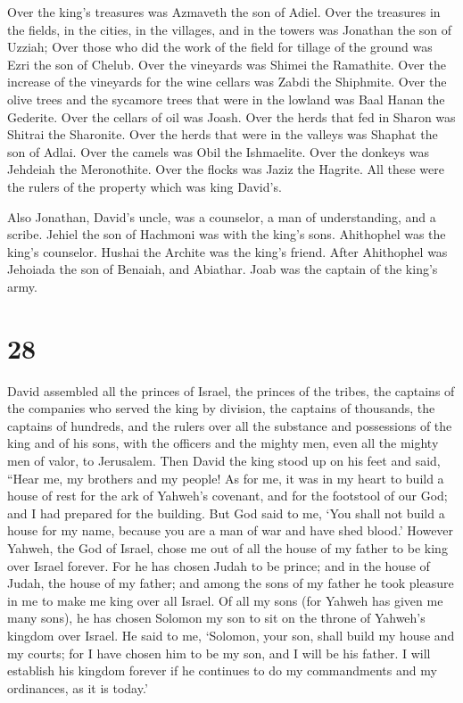  Over the king's treasures was Azmaveth the son of Adiel.
Over the treasures in the fields, in the cities, in the villages, and in
the towers was Jonathan the son of Uzziah;  Over those
who did the work of the field for tillage of the ground was Ezri the son
of Chelub.  Over the vineyards was Shimei the Ramathite.
Over the increase of the vineyards for the wine cellars was Zabdi the
Shiphmite.  Over the olive trees and the sycamore trees
that were in the lowland was Baal Hanan the Gederite. Over the cellars
of oil was Joash.  Over the herds that fed in Sharon was
Shitrai the Sharonite. Over the herds that were in the valleys was
Shaphat the son of Adlai.  Over the camels was Obil the
Ishmaelite. Over the donkeys was Jehdeiah the Meronothite. Over the
flocks was Jaziz the Hagrite.  All these were the rulers
of the property which was king David's.

 Also Jonathan, David's uncle, was a counselor, a man of
understanding, and a scribe. Jehiel the son of Hachmoni was with the
king's sons.  Ahithophel was the king's counselor. Hushai
the Archite was the king's friend.  After Ahithophel was
Jehoiada the son of Benaiah, and Abiathar. Joab was the captain of the
king's army.

\hypertarget{section-27}{%
\section{28}\label{section-27}}

 David assembled all the princes of Israel, the princes of
the tribes, the captains of the companies who served the king by
division, the captains of thousands, the captains of hundreds, and the
rulers over all the substance and possessions of the king and of his
sons, with the officers and the mighty men, even all the mighty men of
valor, to Jerusalem.  Then David the king stood up on his
feet and said, ``Hear me, my brothers and my people! As for me, it was
in my heart to build a house of rest for the ark of Yahweh's covenant,
and for the footstool of our God; and I had prepared for the building.
 But God said to me, `You shall not build a house for my
name, because you are a man of war and have shed blood.' 
However Yahweh, the God of Israel, chose me out of all the house of my
father to be king over Israel forever. For he has chosen Judah to be
prince; and in the house of Judah, the house of my father; and among the
sons of my father he took pleasure in me to make me king over all
Israel.  Of all my sons (for Yahweh has given me many
sons), he has chosen Solomon my son to sit on the throne of Yahweh's
kingdom over Israel.  He said to me, `Solomon, your son,
shall build my house and my courts; for I have chosen him to be my son,
and I will be his father.  I will establish his kingdom
forever if he continues to do my commandments and my ordinances, as it
is today.'

